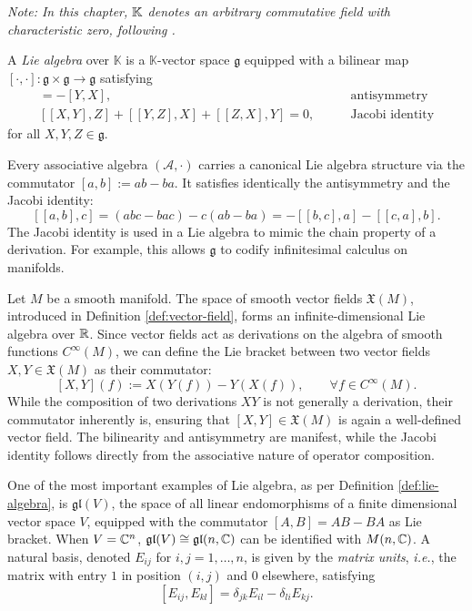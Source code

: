 \textit{Note: In this chapter, $\mathbb{K}$ denotes an arbitrary commutative field with characteristic zero, following \cite{humphreysIntroductionLieAlgebras2010}.}

\begin{definition}\label{def:lie-algebra}
	A \emph{Lie algebra} over $\mathbb{K}$ is a $\mathbb{K}$-vector space $\mathfrak{g}$ equipped with a bilinear map $[\cdot,\cdot]:\mathfrak{g}\times\mathfrak{g}\to\mathfrak{g}$ satisfying
	\begin{align}
	[X,Y] = -[Y,X], \qquad &\text{antisymmetry} \\
	[[X,Y],Z]+[[Y,Z],X]+[[Z,X],Y]=0, \qquad &\text{Jacobi identity}
	\end{align}
	for all $X,Y,Z\in\mathfrak{g}$. 
\end{definition}

\begin{remark}
	Every associative algebra $(\mathcal{A},\cdot)$ carries a canonical Lie algebra
	structure via the commutator $[a,b]:=ab-ba$. It satisfies identically the antisymmetry and the Jacobi identity:
	\[
		[[a,b],c] = (abc - bac) - c(ab - ba) = -[[b,c],a] - [[c,a],b].
	\]
	The Jacobi identity is used in a Lie algebra to mimic the chain property of a derivation. For example, this allows $\mathfrak{g}$ to codify infinitesimal calculus on manifolds.
\end{remark}

\begin{example}\label{ex:lie-fields}
	Let $M$ be a smooth manifold. The space of smooth vector fields $\mathfrak{X}(M)$, introduced in Definition \ref{def:vector-field}, forms an infinite-dimensional Lie algebra over $\mathbb{R}$. Since vector fields act as derivations on the algebra of smooth functions $C^\infty(M)$, we can define the Lie bracket between two vector fields $X, Y \in \mathfrak{X}(M)$ as their commutator:
	\[
	[X, Y](f) := X(Y(f)) - Y(X(f)), \qquad \forall f \in C^\infty(M).
	\]
	While the composition of two derivations $XY$ is not generally a derivation, their commutator inherently is, ensuring that $[X,Y] \in \mathfrak{X}(M)$ is again a well-defined vector field. The bilinearity and antisymmetry are manifest, while the Jacobi identity follows directly from the associative nature of operator composition.
\end{example}

\begin{example}
	One of the most important examples of Lie algebra, as per Definition \ref{def:lie-algebra}, is $\mathfrak{gl}(V)$, the space of all linear endomorphisms of a finite dimensional vector space $V$, equipped with the commutator $[A,B] = AB - BA$ as Lie bracket. When $V = \mathbb{C}^n$, $\mathfrak{gl}(V) \cong \mathfrak{gl}(n,\mathbb{C})$ can be identified with $M(n,\mathbb{C})$. A natural basis, denoted $E_{ij}$ for $i,j = 1,\dots,n$, is given by the \textit{matrix units}, \textit{i.e.}, the matrix with entry $1$ in position $(i,j)$ and $0$ elsewhere, satisfying $$[E_{ij}, E_{kl}] = \delta_{jk}E_{il} - \delta_{li}E_{kj}.$$
\end{example}

